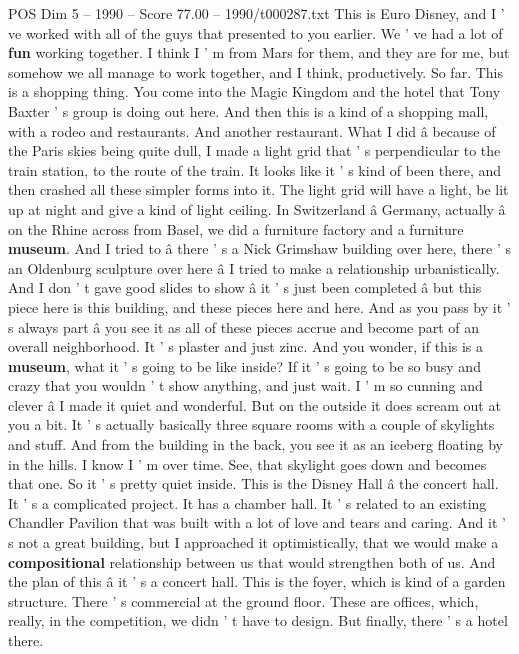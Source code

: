 \begin{textsample}{POS Dim 5 – 1990 – Score 77.00 – 1990/t000287.txt}
This is Euro Disney, and I ' ve worked with all of the guys that presented to you earlier.
We ' ve had a lot of \textbf{fun} working together.
I think I ' m from Mars for them, and they are for me, but somehow we all manage to work together, and I think, productively.
So far.
This is a shopping thing.
You come into the Magic Kingdom and the hotel that Tony Baxter ' s group is doing out here.
And then this is a kind of a shopping mall, with a rodeo and restaurants.
And another restaurant.
What I did â because of the Paris skies being quite dull, I made a light grid that ' s perpendicular to the train station, to the route of the train.
It looks like it ' s kind of been there, and then crashed all these simpler forms into it.
The light grid will have a light, be lit up at night and give a kind of light ceiling.
In Switzerland â Germany, actually â on the Rhine across from Basel, we did a furniture factory and a furniture \textbf{museum}.
And I tried to â there ' s a Nick Grimshaw building over here, there ' s an Oldenburg sculpture over here â I tried to make a relationship urbanistically.
And I don ' t gave good slides to show â it ' s just been completed â but this piece here is this building, and these pieces here and here.
And as you pass by it ' s always part â you see it as all of these pieces accrue and become part of an overall neighborhood.
It ' s plaster and just zinc.
And you wonder, if this is a \textbf{museum}, what it ' s going to be like inside?
If it ' s going to be so busy and crazy that you wouldn ' t show anything, and just wait.
I ' m so cunning and clever â I made it quiet and wonderful.
But on the outside it does scream out at you a bit.
It ' s actually basically three square rooms with a couple of skylights and stuff.
And from the building in the back, you see it as an iceberg floating by in the hills.
I know I ' m over time.
See, that skylight goes down and becomes that one.
So it ' s pretty quiet inside.
This is the Disney Hall â the concert hall.
It ' s a complicated project.
It has a chamber hall.
It ' s related to an existing Chandler Pavilion that was built with a lot of love and tears and caring.
And it ' s not a great building, but I approached it optimistically, that we would make a \textbf{compositional} relationship between us that would strengthen both of us.
And the plan of this â it ' s a concert hall.
This is the foyer, which is kind of a garden structure.
There ' s commercial at the ground floor.
These are offices, which, really, in the competition, we didn ' t have to design.
But finally, there ' s a hotel there.

\end{textsample}
